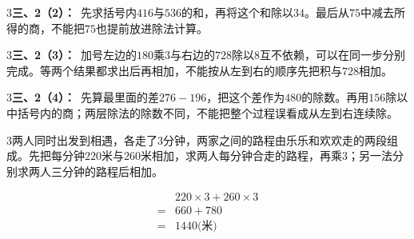 \documentclass[multi=snippet,border={5bp 20bp 5bp 5bp}]{standalone}
\newenvironment{snippet}[3]{\begin{minipage}{#1bp}\color{answerred}\fontsize{#2}{#3}\selectfont\raggedright}{\end{minipage}}
\begin{document}
\begin{snippet}{505}{11.5}{14}\begin{multicols}{3}\raggedcolumns \textbf{三、2（2）：}\ 先求括号内\(416\)\allowbreak 与\(536\)\allowbreak 的和，再将这个和除以\(34\)\allowbreak 。最后从\(75\)\allowbreak 中减去所得的商，不能把\(75\)\allowbreak 也提前放进除法计算。\end{multicols}\end{snippet}
\begin{snippet}{505}{11.5}{14}\begin{multicols}{3}\raggedcolumns \textbf{三、2（3）：}\ 加号左边的\(180\)\allowbreak 乘\(3\)\allowbreak 与右边的\(728\)\allowbreak 除以\(8\)\allowbreak 互不依赖，可以在同一步分别完成。等两个结果都求出后再相加，不能按从左到右的顺序先把积与\(728\)\allowbreak 相加。\end{multicols}\end{snippet}
\begin{snippet}{505}{11.5}{14}\begin{multicols}{3}\raggedcolumns \textbf{三、2（4）：}\ 先算最里面的差\(276-196\)\allowbreak ，把这个差作为\(480\)\allowbreak 的除数。再用\(156\)\allowbreak 除以中括号内的商；两层除法的除数不同，不能把整个过程误看成从左到右连续除。\end{multicols}\end{snippet}
\begin{snippet}{505}{11.5}{14}\begin{multicols}{3}\raggedcolumns 两人同时出发到相遇，各走了\(3\)\allowbreak 分钟，两家之间的路程由乐乐和欢欢走的两段组成。先把每分钟\(220\)\allowbreak 米与\(260\)\allowbreak 米相加，求两人每分钟合走的路程，再乘\(3\)\allowbreak ；另一法分别求两人三分钟的路程后相加。\par \[\begin{aligned}&220\times3+260\times3\\={}&660+780\\={}&1440\text{(米)}\end{aligned}\]\end{multicols}\end{snippet}
\end{document}
